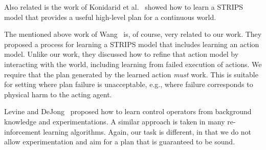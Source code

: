 \documentclass[letterpaper]{article}
\begin{document}
Also related is the work of Konidarid et al.~ showed how to learn a STRIPS model that provides a useful high-level plan for a continuous world. 


The mentioned above work of Wang~\cite{wang1995learning,wang1994learning} is, of course, very related to our work. 
They proposed a process for learning a STRIPS model that includes learning an action model. Unlike our work, they discussed how to refine that action model by interacting with the world, including learning from failed 
execution of actions.  We require that the plan generated by the learned action {\em must} work. This is suitable for setting where plan failure is unacceptable, e.g., where failure corresponds to physical harm to the acting agent.  


Levine and DeJong~ proposed how to learn control operators 
from background knowledge and experimentations. A similar approach is taken in many re-inforcement learning algorithms. Again, our task is different, in that we do not allow experimentation and aim for a plan that is guaranteed to be sound.


\newpage



\end{document}
